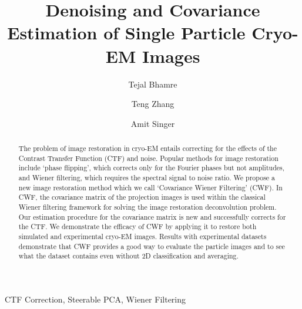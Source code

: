 \documentclass[review]{elsarticle}
\begin{document}
\begin{frontmatter}

\title{Denoising and Covariance Estimation of Single Particle Cryo-EM Images}
% 
\author{Tejal Bhamre}
\address{Department of Physics, Princeton University, Jadwin Hall, Washington Road, Princeton, NJ 08544-0708, USA}

\author{Teng Zhang}
\address{Department of Mathematics, University of Central Florida, 4393 Andromeda Loop N, Orlando, FL 32816-8007, USA}

\author{Amit Singer}
\address{Department of Mathematics and PACM, Princeton University, Fine Hall, Washington Road, Princeton, NJ 08544-1000, USA}


% 
% 
%  
% 
\begin{abstract}
The problem of image restoration in cryo-EM entails correcting for the effects of the Contrast Transfer
Function (CTF) and noise. Popular methods for image restoration include
`phase flipping', which corrects only for the Fourier phases but not amplitudes, and Wiener filtering, which
requires the spectral signal to noise ratio. We propose a new image restoration method
which we call `Covariance Wiener Filtering' (CWF).
In CWF, the covariance matrix of the projection images is used within the 
classical Wiener filtering framework for solving the image restoration 
deconvolution problem. Our estimation procedure for the covariance matrix is new 
and successfully corrects for the CTF.   
We demonstrate the efficacy of CWF by applying it to restore both simulated and experimental cryo-EM images.
Results with experimental datasets demonstrate that CWF provides a good way to 
evaluate the particle images and to see what the dataset contains even without 2D 
classification and averaging.

\end{abstract}

\begin{keyword}
CTF Correction, Steerable PCA, Wiener Filtering
\end{keyword}

\end{frontmatter}
\end{document}
